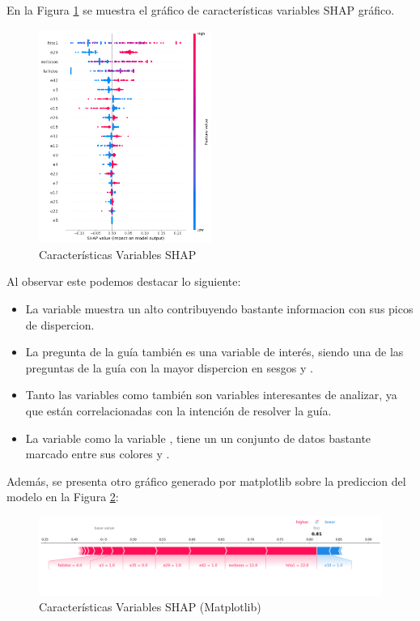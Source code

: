En la Figura \ref{fig:caract_var_shap} se muestra el gráfico de características variables SHAP gráfico.

\begin{figure}[H]
    \centering
    \includegraphics[width=0.5\textwidth]{img/shap_rf/shapForcePlot2.png}
    \caption{Características Variables SHAP}
    \label{fig:caract_var_shap}
\end{figure}

Al observar este podemos destacar lo siguiente:

\begin{itemize}
    \item La variable   muestra un alto  contribuyendo bastante informacion con sus picos de dispercion.
    \item La pregunta de la guía  también es una variable de interés, siendo una de las preguntas de la guía con la mayor dispercion en sesgos  y .
    \item Tanto las variables  como  también son variables interesantes de analizar, ya que están correlacionadas con la intención de resolver la guía.
    \item La variable  como la variable , tiene un un conjunto de datos bastante marcado entre  sus colores  y .
\end{itemize}

Además, se presenta otro gráfico generado por matplotlib sobre la prediccion del modelo en la Figura \ref{fig:caract_var_shap_mat}:

\begin{figure}[H]
    \centering
    \includegraphics[width=1\textwidth]{img/shap_rf/shapForcePlot.png}
    \caption{Características Variables SHAP (Matplotlib)}
    \label{fig:caract_var_shap_mat}
\end{figure}

